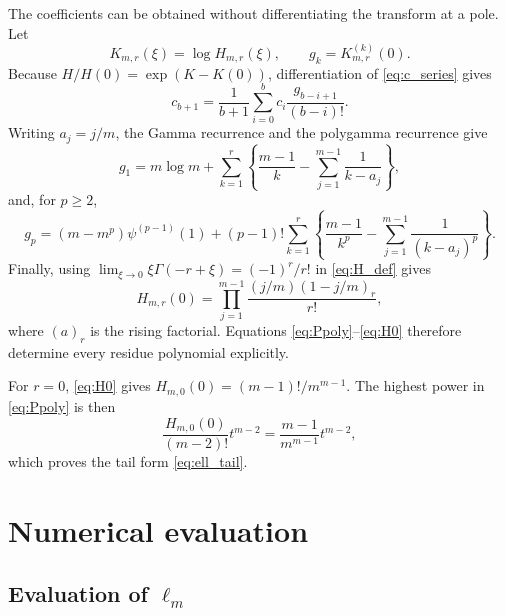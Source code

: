 \documentclass[11pt]{article}
\theoremstyle{remark}
\begin{document}
The coefficients can be obtained without differentiating the transform at a pole. Let
\begin{equation}
 K_{m,r}(\xi)=\log H_{m,r}(\xi),
 \qquad
 g_k=K_{m,r}^{(k)}(0).
 \label{eq:K_g}
\end{equation}
Because $H/H(0)=\exp(K-K(0))$, differentiation of \eqref{eq:c_series} gives
\begin{equation}
 c_{b+1}=\frac1{b+1}\sum_{i=0}^b
 c_i\frac{g_{b-i+1}}{(b-i)!}.
 \label{eq:c_recurrence}
\end{equation}
Writing $a_j=j/m$, the Gamma recurrence and the polygamma recurrence give
\begin{equation}
 g_1=m\log m+
 \sum_{k=1}^r\left\{
 \frac{m-1}{k}-\sum_{j=1}^{m-1}\frac1{k-a_j}
 \right\},
 \label{eq:g1}
\end{equation}
and, for $p\ge2$,
\begin{equation}
 g_p=(m-m^p)\psi^{(p-1)}(1)
 +(p-1)!\sum_{k=1}^r\left\{
 \frac{m-1}{k^p}-\sum_{j=1}^{m-1}\frac1{(k-a_j)^p}
 \right\}.
 \label{eq:gp}
\end{equation}
Finally, using $\lim_{\xi\to0}\xi\Gamma(-r+\xi)=(-1)^r/r!$ in \eqref{eq:H_def} gives
\begin{equation}
 H_{m,r}(0)=
 \prod_{j=1}^{m-1}\frac{(j/m)(1-j/m)_r}{r!},
 \label{eq:H0}
\end{equation}
where $(a)_r$ is the rising factorial. Equations \eqref{eq:Ppoly}--\eqref{eq:H0} therefore determine every residue polynomial explicitly.

For $r=0$, \eqref{eq:H0} gives $H_{m,0}(0)=(m-1)!/m^{m-1}$. The highest power in \eqref{eq:Ppoly} is then
\[
 \frac{H_{m,0}(0)}{(m-2)!}t^{m-2}
 =\frac{m-1}{m^{m-1}}t^{m-2},
\]
which proves the tail form \eqref{eq:ell_tail}.

\section{Numerical evaluation}
\label{app:numerical_details}

\subsection{Evaluation of \texorpdfstring{$\ell_m$}{ell-m}}
\end{document}

